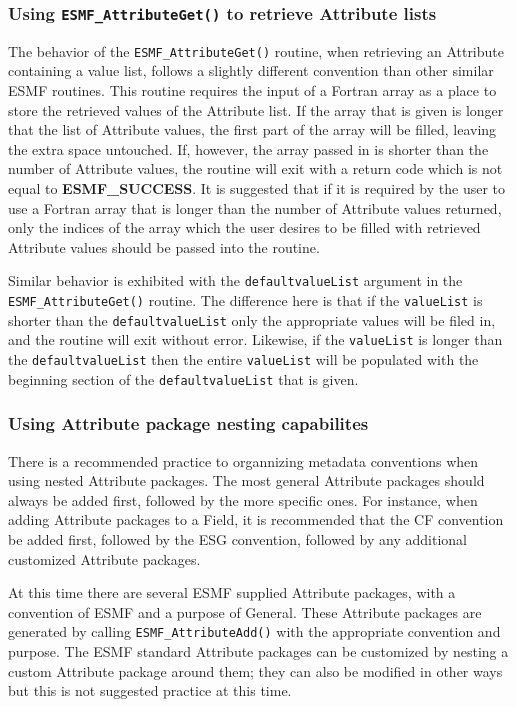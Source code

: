 \subsubsection{Using {\tt ESMF\_AttributeGet()} to retrieve Attribute lists}

The behavior of the {\tt ESMF\_AttributeGet()} routine, when retrieving an Attribute containing a value list, follows a slightly different convention than other similar ESMF routines.  This routine requires the input of a Fortran array as a place to store the retrieved values of the Attribute list.  If the array that is given is longer that the list of Attribute values, the first part of the array will be filled, leaving the extra space untouched.  If, however, the array passed in is shorter than the number of Attribute values, the routine will exit with a return code which is not equal to {\bf ESMF\_SUCCESS}.  It is suggested that if it is required by the user to use a Fortran array that is longer than the number of Attribute values returned, only the indices of the array which the user desires to be filled with retrieved Attribute values should be passed into the routine.  
  
Similar behavior is exhibited with the {\tt defaultvalueList} argument in the {\tt ESMF\_AttributeGet()} routine.  The difference here is that if the {\tt valueList} is shorter than the {\tt defaultvalueList} only the appropriate values will be filed in, and the routine will exit without error.  Likewise, if the {\tt valueList} is longer than the {\tt defaultvalueList} then the entire {\tt valueList} will be populated with the beginning section of the {\tt defaultvalueList} that is given.  

\subsubsection{Using Attribute package nesting capabilites}

There is a recommended practice to organnizing metadata conventions when using nested Attribute packages.  The most general Attribute packages should always be added first, followed by the more specific ones.  For instance, when adding Attribute packages to a Field, it is recommended that the CF convention be added first, followed by the ESG convention, followed by any additional customized Attribute packages.  

At this time there are several ESMF supplied Attribute packages, with a convention of ESMF and a purpose of General.  These Attribute packages are generated by calling {\tt ESMF\_AttributeAdd()} with the appropriate convention and purpose.  The ESMF standard Attribute packages can be customized by nesting a custom Attribute package around them; they can also be modified in other ways but this is not suggested practice at this time.

